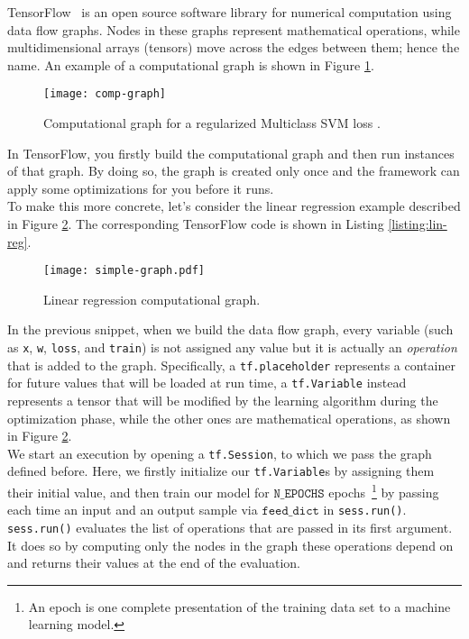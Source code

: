 TensorFlow~\cite{tf} is an open source software library for numerical computation using data flow graphs.
Nodes in these graphs represent mathematical operations, while multidimensional arrays (tensors) move across the edges between them; hence the name.
An example of a computational graph is shown in Figure \ref{fig:comp-graph}.
\begin{figure}[H]
  \centering
  \texttt{[image: comp-graph]}
  \caption{Computational graph for a regularized Multiclass SVM loss \cite{deepsw}.} 
  \label{fig:comp-graph}
\end{figure}

In TensorFlow, you firstly build the computational graph and then run instances of that graph.
By doing so, the graph is created only once and the framework can apply some optimizations for you before it runs.\\

To make this more concrete, let's consider the linear regression example described in Figure \ref{fig:lin_reg-graph}. 
The corresponding TensorFlow code is shown in Listing \ref{listing:lin-reg}.
\begin{figure}[H]
  \centering
  \texttt{[image: simple-graph.pdf]}
  \caption{Linear regression computational graph.} 
  \label{fig:lin_reg-graph}
\end{figure}



In the previous snippet, when we build the data flow graph, every variable (such as \texttt{x}, \texttt{w}, \texttt{loss}, and \texttt{train}) is not assigned any value but it is actually an \textit{operation} that is added to the graph.
Specifically, a \texttt{tf.placeholder} represents a container for future values that will be loaded at run time, a \texttt{tf.Variable} instead represents a tensor that will be modified by the learning algorithm during the optimization phase, while the other ones are mathematical operations, as shown in Figure \ref{fig:lin_reg-graph}.\\

We start an execution by opening a \texttt{tf.Session}, to which we pass the graph defined before.
Here, we firstly initialize our \texttt{tf.Variable}s by assigning them their initial value, and then train our model for $\texttt{N\_EPOCHS}$ epochs~\footnote{An epoch is one complete presentation of the training data set to a machine learning model.} by passing each time an input and an output sample via $\texttt{feed\_dict}$ in \texttt{sess.run()}.
\texttt{sess.run()} evaluates the list of operations that are passed in its first argument.
It does so by computing only the nodes in the graph these operations depend on and returns their values at the end of the evaluation.\\

